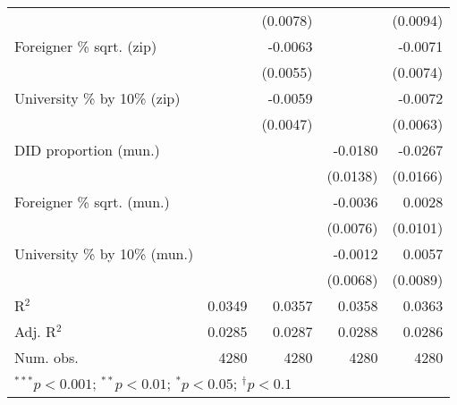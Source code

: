 \begin{tabular}{l D{.}{.}{4.6} D{.}{.}{4.6} D{.}{.}{4.6} D{.}{.}{4.6}}
                                  &              & (0.0078)     &              & (0.0094)     \\
Foreigner \% sqrt. (zip)          &              & -0.0063      &              & -0.0071      \\
                                  &              & (0.0055)     &              & (0.0074)     \\
University \% by 10\% (zip)       &              & -0.0059      &              & -0.0072      \\
                                  &              & (0.0047)     &              & (0.0063)     \\
DID proportion (mun.)             &              &              & -0.0180      & -0.0267      \\
                                  &              &              & (0.0138)     & (0.0166)     \\
Foreigner \% sqrt. (mun.)         &              &              & -0.0036      & 0.0028       \\
                                  &              &              & (0.0076)     & (0.0101)     \\
University \% by 10\% (mun.)      &              &              & -0.0012      & 0.0057       \\
                                  &              &              & (0.0068)     & (0.0089)     \\
\midrule
R$^2$                             & 0.0349       & 0.0357       & 0.0358       & 0.0363       \\
Adj. R$^2$                        & 0.0285       & 0.0287       & 0.0288       & 0.0286       \\
Num. obs.                         & 4280         & 4280         & 4280         & 4280         \\
\bottomrule
{}
\end{tabular}
